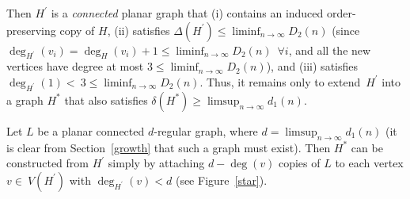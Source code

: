 \documentclass{article}
\newtheorem{Proof of Theorem}{Proof of Theorem}
\begin{document}
Then $H^{\prime}$ is a \textit{connected} planar graph that
(i) contains an induced order-preserving copy of $H$,
(ii) satisfies $\Delta(H^{\prime}) \leq \liminf_{n \to \infty} D_{2}(n)$
(since $\deg_{H^{\prime}}(v_{i}) = \deg_{H}(v_{i})+1 \leq \liminf_{n \to \infty} D_{2}(n)$~$\forall i$,
and all the new vertices have degree at most $3 \leq \liminf_{n \to \infty} D_{2}(n)$),
and (iii) satisfies $\deg_{H^{\prime}}(1) <~\!3 \leq \liminf_{n \to \infty} D_{2}(n)$.
Thus, it remains only to extend~$H^{\prime}$ into a graph $H^{*}$ 
that also satisfies $\delta(H^{*}) \geq \limsup_{n \to \infty} d_{1}(n)$.

Let $L$ be a planar connected $d$-regular graph,
where $d= \limsup_{n \to \infty} d_{1}(n)$
(it is clear from Section~\ref{growth} that such a graph must exist).
Then $H^{*}$ can be constructed from $H^{\prime}$ simply by attaching $d - \deg(v)$ copies of $L$
to each vertex $v \in~V(H^{\prime})$ with $\deg_{H^{\prime}}(v)<d$ (see Figure~\ref{star}).
\end{document}
